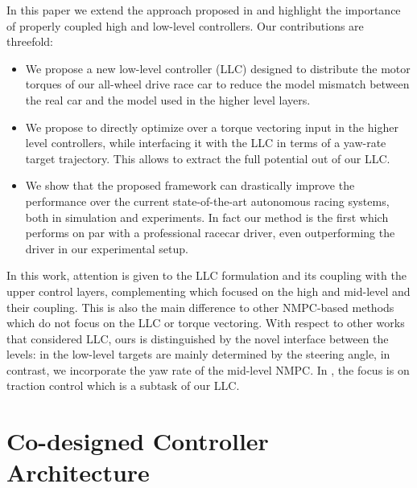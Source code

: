 In this paper we extend the approach proposed in \cite{vazquez2020optimization} and highlight the importance of properly coupled high and low-level controllers. Our contributions are threefold: 
\begin{itemize}
    \item We propose a new low-level controller (LLC) designed to distribute the motor torques of our all-wheel drive race car to reduce the model mismatch between the real car and the model used in the higher level layers.
    \item We propose to directly optimize over a torque vectoring input in the higher level controllers, while interfacing it with the LLC in terms of a yaw-rate target trajectory. This allows to extract the full potential out of our LLC.
    \item We show that the proposed framework can drastically improve the performance over the current state-of-the-art autonomous racing systems, both in simulation and experiments. In fact our method is the first which performs on par with a professional racecar driver, even outperforming the driver in our experimental setup.
\end{itemize}
In this work, attention is given to the LLC formulation and its coupling with the upper control layers, complementing \cite{vazquez2020optimization} which focused on the high and mid-level and their coupling. 
This is also the main difference to other NMPC-based methods \cite{Liniger2015,Rosolia2017,williams2016aggressive} which do not focus on the LLC or torque vectoring. 
With respect to other works that considered LLC, ours is distinguished by the novel interface between the levels:
in \cite{Chatzikomis_2018,roborace_llc,vazquez2020optimization,Kabzan2019_AMZ} the low-level targets are mainly determined by the steering angle, in contrast, we incorporate the yaw rate of the mid-level NMPC. 
In \cite{TALVALA2011137, Gerdes2012}, the focus is on traction control which is a subtask of our LLC.

\section{Co-designed Controller Architecture}

